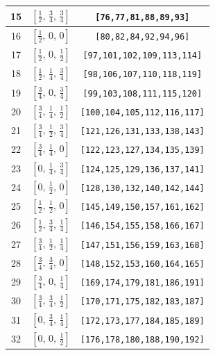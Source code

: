 \documentclass[fleqn,8pt]{jsarticle}
\begin{document}
\begin{longtable}{ccc}
15 & $\left[ \frac{1}{2},\, \frac{3}{4},\, \frac{3}{4} \right]$ & {\tt [76,77,81,88,89,93]} \\ \hline
16 & $\left[ \frac{1}{2},\, 0,\, 0 \right]$ & {\tt [80,82,84,92,94,96]} \\ \hline
17 & $\left[ \frac{1}{2},\, 0,\, \frac{1}{2} \right]$ & {\tt [97,101,102,109,113,114]} \\ \hline
18 & $\left[ \frac{1}{2},\, \frac{1}{4},\, \frac{3}{4} \right]$ & {\tt [98,106,107,110,118,119]} \\ \hline
19 & $\left[ \frac{3}{4},\, 0,\, \frac{3}{4} \right]$ & {\tt [99,103,108,111,115,120]} \\ \hline
20 & $\left[ \frac{3}{4},\, \frac{1}{4},\, \frac{1}{2} \right]$ & {\tt [100,104,105,112,116,117]} \\ \hline
21 & $\left[ \frac{3}{4},\, \frac{1}{2},\, \frac{3}{4} \right]$ & {\tt [121,126,131,133,138,143]} \\ \hline
22 & $\left[ \frac{3}{4},\, \frac{1}{4},\, 0 \right]$ & {\tt [122,123,127,134,135,139]} \\ \hline
23 & $\left[ 0,\, \frac{1}{4},\, \frac{3}{4} \right]$ & {\tt [124,125,129,136,137,141]} \\ \hline
24 & $\left[ 0,\, \frac{1}{2},\, 0 \right]$ & {\tt [128,130,132,140,142,144]} \\ \hline
25 & $\left[ \frac{1}{2},\, \frac{1}{2},\, 0 \right]$ & {\tt [145,149,150,157,161,162]} \\ \hline
26 & $\left[ \frac{1}{2},\, \frac{3}{4},\, \frac{1}{4} \right]$ & {\tt [146,154,155,158,166,167]} \\ \hline
27 & $\left[ \frac{3}{4},\, \frac{1}{2},\, \frac{1}{4} \right]$ & {\tt [147,151,156,159,163,168]} \\ \hline
28 & $\left[ \frac{3}{4},\, \frac{3}{4},\, 0 \right]$ & {\tt [148,152,153,160,164,165]} \\ \hline
29 & $\left[ \frac{3}{4},\, 0,\, \frac{1}{4} \right]$ & {\tt [169,174,179,181,186,191]} \\ \hline
30 & $\left[ \frac{3}{4},\, \frac{3}{4},\, \frac{1}{2} \right]$ & {\tt [170,171,175,182,183,187]} \\ \hline
31 & $\left[ 0,\, \frac{3}{4},\, \frac{1}{4} \right]$ & {\tt [172,173,177,184,185,189]} \\ \hline
32 & $\left[ 0,\, 0,\, \frac{1}{2} \right]$ & {\tt [176,178,180,188,190,192]} \\
\end{longtable}
\renewcommand{\arraystretch}{1.2}
\end{document}
